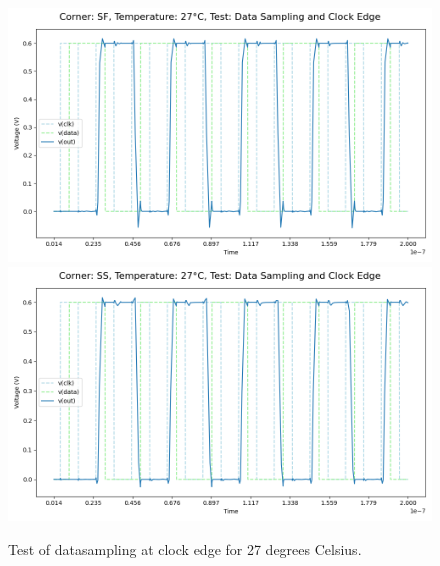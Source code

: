 \begin{figure}[H]
    \vspace{5pt}
    \includegraphics[height= 0.21\textheight]{figures/aimspice/SF/27/W1.csv.png}
    \vspace{5pt}
    \includegraphics[height= 0.21\textheight]{figures/aimspice/SS/27/W1.csv.png}
    \caption{Test of datasampling at clock edge for 27 degrees Celsius.}
    \label{fig:aimspice_W1_27}
\end{figure}

\pagebreak

